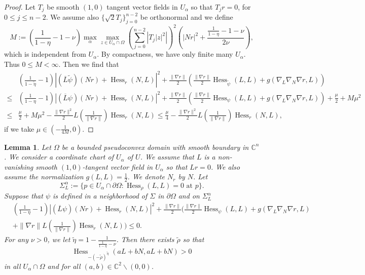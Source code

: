\documentclass[11pt]{article}
\theoremstyle{plain} \numberwithin{equation}{section}
\newtheorem{lemma}[theorem]{Lemma}
\theoremstyle{definition}
\DeclareMathOperator{\Hessian}{Hess}
\begin{document}
\begin{proof}
	Let $T_j$ be smooth $(1,0)$ tangent vector fields in $U_\alpha$ so that $T_j r=0$, for $0\leq j\leq n-2$. We assume also $\lbrace \sqrt{2}T_j\rbrace_{j=0}^{n-2}$ be orthonormal and we define \[M:=\left(\frac{1}{1-\eta}-1-\nu\right)\max_{\alpha}\max_{z\in U_\alpha\cap\Omega}\left(\sum_{j=0}^{n-2}\left|T_j|z|^2\right|\right)^2\left(|Nr|^2+\frac{\frac{1}{1-\eta}-1-\nu}{2\nu}\right),\] which is independent from $U_\alpha$. By compactness, we have only finite many $U_\alpha$. Thus $0\leq M<\infty$. Then we find that \[\begin{split}
	&\left(\frac{1}{1-\tilde{\eta}}-1\right)\left|(\overline{L}\tilde{\psi})(Nr)+\Hessian_r(N, L)\right|^2+\frac{\|\nabla r\|}{2}\left(\frac{\|\nabla r\|}{2}\Hessian_{\tilde{\psi}}(L, L)+g(\nabla_L\nabla_N\nabla r, L)\right)\\\leq&\left(\frac{1}{1-\eta}-1\right)\left|(\overline{L}\psi)(Nr)+\Hessian_r(N, L)\right|^2+\frac{\|\nabla r\|}{2}\left(\frac{\|\nabla r\|}{2}\Hessian_\psi(L, L)+g(\nabla_L\nabla_N\nabla r, L)\right)+\frac{\mu}{2}+M\mu^2\\\leq&\frac{\mu}{2}+M\mu^2-\frac{\|\nabla r\|^2}{2}L\left(\frac{1}{\|\nabla r\|}\right)\Hessian_r(N, L)\leq\frac{\mu}{4}-\frac{\|\nabla r\|^2}{2}L\left(\frac{1}{\|\nabla r\|}\right)\Hessian_r(N, L),
	\end{split}\] if we take $\mu\in (-\frac{1}{4M},0)$.
\end{proof}

\begin{lemma}\label{2.5}
		Let $\Omega$ be a bounded pseudoconvex domain with smooth boundary in $\mathbb{C}^n$. We consider a coordinate chart of $U_\alpha$ of $U$. We assume that $L$ is a non-vanishing smooth $(1,0)$-tangent vector field in $U_\alpha$ so that $Lr=0$. We also assume the normalization $g(L, L)=\frac{1}{2}$. We denote $N_r$ by $N$. Let \[\Sigma^\alpha_L:=\lbrace p\in U_\alpha\cap\partial\Omega: \Hessian_\rho(L, L)=0 \text{  at  } p\rbrace.\] Suppose that $\psi$ is defined in a neighborhood of $\Sigma$ in $\partial\Omega$ and on $\Sigma^\alpha_L$
	\[\begin{split}
	&\left(\frac{1}{1-\eta}-1\right)\left|(\overline{L}\psi)(Nr)+\Hessian_r(N, L)\right|^2+\frac{\|\nabla r\|}{2}\Bigg(\frac{\|\nabla r\|}{2}\Hessian_\psi(L, L)+g(\nabla_L\nabla_N\nabla r, L)\\&+\|\nabla r\|L\left(\frac{1}{\|\nabla r\|}\right)\Hessian_r(N, L)\Bigg)\leq 0.
	\end{split}
	\] For any $\nu>0$, we let $\tilde{\eta}=1-\frac{1}{\frac{1}{1-\eta}-\nu}$. Then there exists $\tilde{\rho}$ so that  \[\Hessian_{-(-\tilde{\rho})^{\tilde{\eta}}}(aL+bN,aL+bN)>0\] in all $U_\alpha\cap\Omega$ and for all $(a,b)\in\mathbb{C}^2\backslash(0,0)$.
\end{lemma}
\end{document}
